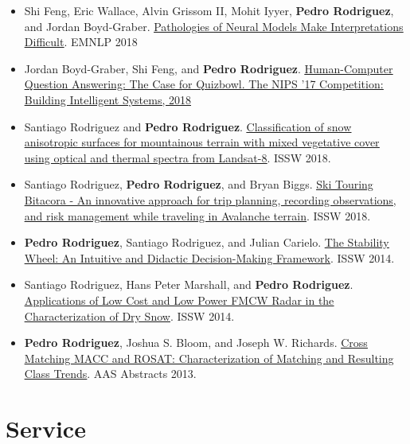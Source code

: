\documentclass[11pt,a4paper,sans]{moderncv} %
\newcommand{\myhref}[2]{\href{#1}{\setulcolor{cyan}\ul{#2}}}
\begin{document}
{\begin{itemize}
    \item Shi Feng, Eric Wallace, Alvin Grissom II, Mohit Iyyer, \textbf{Pedro Rodriguez}, and Jordan Boyd-Graber. \myhref{https://arxiv.org/abs/1804.07781}{Pathologies of Neural Models Make Interpretations Difficult}. EMNLP 2018
    \item Jordan Boyd-Graber, Shi Feng, and \textbf{Pedro Rodriguez}. \myhref{https://www.entilzha.io/static/publications/2018_nips_qbcomp.pdf}{Human-Computer Question Answering: The Case for Quizbowl. The NIPS '17 Competition: Building Intelligent Systems, 2018}
	\item Santiago Rodriguez and \textbf{Pedro Rodriguez}. \myhref{https://arc.lib.montana.edu/snow-science/objects/ISSW2018_P04.4.pdf}{Classification of snow anisotropic surfaces for mountainous terrain with mixed vegetative cover using optical and thermal spectra from Landsat-8}. ISSW 2018.
	\item Santiago Rodriguez, \textbf{Pedro Rodriguez}, and Bryan Biggs. \myhref{https://arc.lib.montana.edu/snow-science/objects/ISSW2018_P18.4.pdf}{Ski Touring Bitacora - An innovative approach for trip planning, recording observations, and risk management while traveling in Avalanche terrain}. ISSW 2018.
	\item \textbf{Pedro Rodriguez}, Santiago Rodriguez, and Julian Carielo. \myhref{http://arc.lib.montana.edu/snow-science/objects/ISSW14_paper_P4.34.pdf}{The Stability Wheel: An Intuitive and Didactic Decision-Making Framework}. ISSW 2014.
	\item Santiago Rodriguez, Hans Peter Marshall, and \textbf{Pedro Rodriguez}. \myhref{http://citeseerx.ist.psu.edu/viewdoc/download?doi=10.1.1.977.7907&rep=rep1&type=pdf}{Applications of Low Cost and Low Power FMCW Radar in the Characterization of Dry Snow}. ISSW 2014.
	\item \textbf{Pedro Rodriguez}, Joshua S. Bloom, and Joseph W. Richards. \myhref{http://adsabs.harvard.edu/abs/2013AAS...22135428R}{Cross Matching MACC and ROSAT: Characterization of Matching and Resulting Class Trends}. AAS Abstracts 2013.
  \end{itemize}
}{}

\section{Service}
\end{document}
